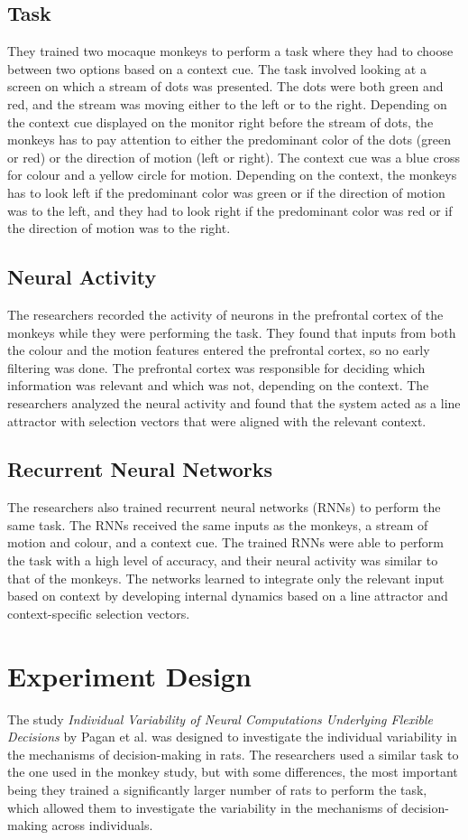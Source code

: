 \documentclass{article}
\begin{document}
\subsection{Task}
They trained two mocaque monkeys to perform a task where they had to choose between two options based on a context cue. The task involved looking at a screen on which a stream of dots was presented. The dots were both green and red, and the stream was moving either to the left or to the right. Depending on the context cue displayed on the monitor right before the stream of dots, the monkeys has to pay attention to either the predominant color of the dots (green or red) or the direction of motion (left or right). The context cue was a blue cross for colour and a yellow circle for motion. Depending on the context, the monkeys has to look left if the predominant color was green or if the direction of motion was to the left, and they had to look right if the predominant color was red or if the direction of motion was to the right.

\subsection{Neural Activity}
The researchers recorded the activity of neurons in the prefrontal cortex of the monkeys while they were performing the task. They found that inputs from both the colour and the motion features entered the prefrontal cortex, so no early filtering was done. The prefrontal cortex was responsible for deciding which information was relevant and which was not, depending on the context. The researchers analyzed the neural activity and found that the system acted as a line attractor with selection vectors that were aligned with the relevant context. 

\subsection{Recurrent Neural Networks}
The researchers also trained recurrent neural networks (RNNs) to perform the same task. The RNNs received the same inputs as the monkeys, a stream of motion and colour, and a context cue. The trained RNNs were able to perform the task with a high level of accuracy, and their neural activity was similar to that of the monkeys. The networks learned to integrate only the relevant input based on context by developing internal dynamics based on a line attractor and context-specific selection vectors.


\section{Experiment Design}
The study \textit{Individual Variability of Neural Computations Underlying Flexible Decisions} by Pagan et al. was designed to investigate the individual variability in the mechanisms of decision-making in rats. The researchers used a similar task to the one used in the monkey study, but with some differences, the most important being they trained a significantly larger number of rats to perform the task, which allowed them to investigate the variability in the mechanisms of decision-making across individuals.
\end{document}
